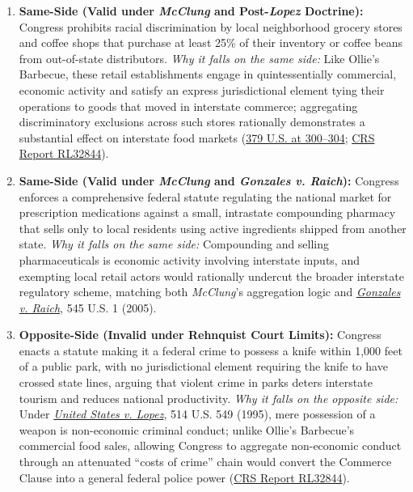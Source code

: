 \documentclass[12pt]{article}
\begin{document}
\begin{enumerate}
\item \textbf{Same-Side (Valid under \textit{McClung} and Post-\textit{Lopez} Doctrine):} Congress prohibits racial discrimination by local neighborhood grocery stores and coffee shops that purchase at least 25\% of their inventory or coffee beans from out-of-state distributors. \textit{Why it falls on the same side:} Like Ollie's Barbecue, these retail establishments engage in quintessentially commercial, economic activity and satisfy an express jurisdictional element tying their operations to goods that moved in interstate commerce; aggregating discriminatory exclusions across such stores rationally demonstrates a substantial effect on interstate food markets (\href{https://supreme.justia.com/cases/federal/us/379/294/}{379 U.S. at 300--304}; \href{https://www.everycrsreport.com/reports/RL32844.html}{CRS Report RL32844}).

\item \textbf{Same-Side (Valid under \textit{McClung} and \textit{Gonzales v. Raich}):} Congress enforces a comprehensive federal statute regulating the national market for prescription medications against a small, intrastate compounding pharmacy that sells only to local residents using active ingredients shipped from another state. \textit{Why it falls on the same side:} Compounding and selling pharmaceuticals is economic activity involving interstate inputs, and exempting local retail actors would rationally undercut the broader interstate regulatory scheme, matching both \textit{McClung}'s aggregation logic and \href{https://supreme.justia.com/cases/federal/us/545/1/}{\textit{Gonzales v. Raich}}, 545 U.S. 1 (2005).

\item \textbf{Opposite-Side (Invalid under Rehnquist Court Limits):} Congress enacts a statute making it a federal crime to possess a knife within 1,000 feet of a public park, with no jurisdictional element requiring the knife to have crossed state lines, arguing that violent crime in parks deters interstate tourism and reduces national productivity. \textit{Why it falls on the opposite side:} Under \href{https://supreme.justia.com/cases/federal/us/514/549/}{\textit{United States v. Lopez}}, 514 U.S. 549 (1995), mere possession of a weapon is non-economic criminal conduct; unlike Ollie's Barbecue's commercial food sales, allowing Congress to aggregate non-economic conduct through an attenuated ``costs of crime'' chain would convert the Commerce Clause into a general federal police power (\href{https://www.everycrsreport.com/reports/RL32844.html}{CRS Report RL32844}).


\end{enumerate}
\end{document}
